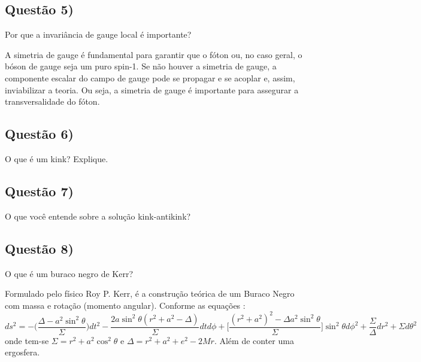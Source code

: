 \documentclass{article}
\begin{document}
\subsection*{Questão 5)}
\begin{boxx}
Por que a invariância de gauge local é importante?
\end{boxx}
 A simetria de gauge é fundamental para garantir que o fóton ou,
no caso geral, o bóson de gauge seja um puro spin-1. Se não houver
a simetria de gauge, a componente escalar do campo de gauge pode
se propagar e se acoplar e, assim, inviabilizar a teoria. Ou seja, a
simetria de gauge é importante para assegurar a transversalidade do
fóton.

\subsection*{Questão 6)}
\begin{boxx}
O que é um kink? Explique.
\end{boxx}

\subsection*{Questão 7)}
\begin{boxx}
O que você entende sobre a solução kink-antikink?
\end{boxx}

\subsection*{Questão 8)}
\begin{boxx}
O que é um buraco negro de Kerr?
\end{boxx}
 Formulado pelo físico Roy P. Kerr, é a construção teórica de um Buraco Negro com massa e rotação (momento angular).
  Conforme as equações :
  \begin{equation}
      ds^2 = - \bigg(\frac{\Delta-a^2\sin^2{\theta}}{\Sigma}\bigg)dt^2-\frac{2a\sin^2{\theta(r^2+a^2-\Delta)}}{\Sigma}dtd\phi + \bigg[\frac{(r^2+a^2)^2-\Delta a^2\sin^2{\theta}}{\Sigma}\bigg]\sin^2{\theta}d\phi^2 + \frac{\Sigma}{\Delta}dr^2 + \Sigma d \theta^2
  \end{equation}
  onde tem-se $\Sigma = r^2 + a^2\cos^2{\theta}$  e  $\Delta = r^2 + a^2 + e^2 - 2Mr$. Além de conter uma ergosfera.

 
\end{document}
